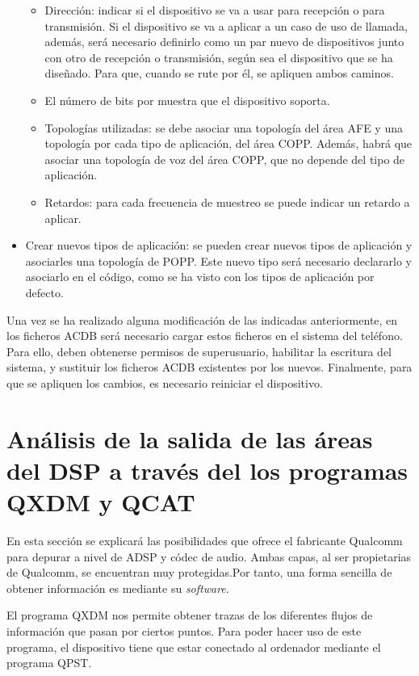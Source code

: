 \begin{itemize}
\begin{itemize}
		\item{Dirección: indicar si el dispositivo se va a usar para recepción o para transmisión. Si el dispositivo se va a aplicar a un caso de uso de llamada, además, será necesario definirlo como un par nuevo de dispositivos junto con otro de recepción o transmisión, según sea el dispositivo que se ha diseñado. Para que, cuando se rute por él, se apliquen ambos caminos.}
		\item{El número de bits por muestra que el dispositivo soporta.}
		\item{Topologías utilizadas: se debe asociar una topología del área \gls{AFE} y una topología por cada tipo de aplicación, del área \gls{COPP}. Además, habrá que asociar una topología de voz del área \gls{COPP}, que no depende del tipo de aplicación.}
		\item{Retardos: para cada frecuencia de muestreo se puede indicar un retardo a aplicar.}
	\end{itemize}
	\item{Crear nuevos tipos de aplicación: se pueden crear nuevos tipos de aplicación y asociarles una topología de \gls{POPP}. Este nuevo tipo será necesario declararlo y asociarlo en el código, como se ha visto con los tipos de aplicación por defecto.}
\end{itemize}

Una vez se ha realizado alguna modificación de las indicadas anteriormente, en los ficheros \gls{ACDB} será necesario cargar estos ficheros en el sistema del teléfono. Para ello, deben obtenerse permisos de superusuario, habilitar la escritura del sistema, y sustituir los ficheros \gls{ACDB} existentes por los nuevos. Finalmente, para que se apliquen los cambios, es necesario reiniciar el dispositivo.

\section{Análisis de la salida de las áreas del DSP a través del los programas QXDM y QCAT} \label{sec:salida_qxdm}
En esta sección se explicará las posibilidades que ofrece el fabricante Qualcomm para depurar a nivel de \gls{ADSP} y códec de audio. Ambas capas, al ser propietarias de Qualcomm, se encuentran muy protegidas.Por tanto, una forma sencilla de obtener información es mediante su \textit{software}.

El programa \gls{QXDM} nos permite obtener trazas de los diferentes flujos de información que pasan por ciertos puntos. Para poder hacer uso de este programa, el dispositivo tiene que estar conectado al ordenador mediante el programa \gls{QPST}.

